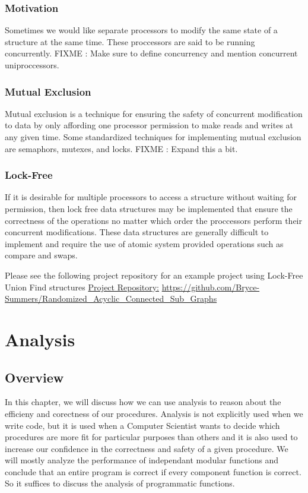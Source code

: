 \documentclass[12pt, letterpaper]{book}
\begin{document}
	\subsection{Motivation}
	Sometimes we would like separate processors to modify the same state of a structure at the same time. These proccessors are said to be running concurrently. FIXME : Make sure to define concurrency and mention concurrent uniproccessors.
	\subsection{Mutual Exclusion}
Mutual exclusion is a technique for ensuring the safety of concurrent modification to data by only affording one processor permission to make reads and writes at any given time. Some standardized techniques for implementing mutual exclusion are semaphors, mutexes, and locks. FIXME : Expand this a bit.
	\subsection{Lock-Free}
	If it is desirable for multiple processors to access a structure without waiting for permission, then lock free data structures may be implemented that ensure the correctness of the operations no matter which order the proccessors perform their concurrent modifications. These data structures are generally difficult to implement and require the use of atomic system provided operations such as compare and swaps.

	Please see the following project repository for an example project using Lock-Free Union Find structures \href{https://github.com/Bryce-Summers/Randomized_Acyclic_Connected_Sub_Graphs}{Project Repository:}
\url{https://github.com/Bryce-Summers/Randomized_Acyclic_Connected_Sub_Graphs} 

\chapter{Analysis} \label{analysis}

	\section{Overview}

		In this chapter, we will discuss how we can use analysis to reason about the efficieny and corectness of our procedures. Analysis is not explicitly used when we write code, but it is used when a Computer Scientist wants to decide which procedures are more fit for particular purposes than others and it is also used to increase our confidence in the correctness and safety of a given procedure. We will mostly analyze the performance of independant modular functions and conclude that an entire program is correct if every component function is correct. So it suffices to discuss the analysis of programmatic functions.
\end{document}
